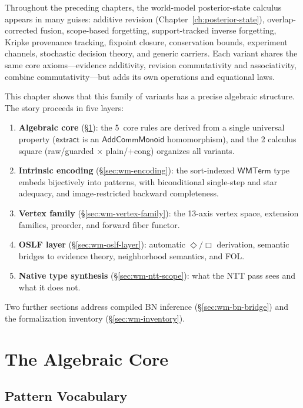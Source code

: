 \documentclass[11pt,openany]{report}
\begin{document}
Throughout the preceding chapters, the world-model posterior-state calculus
appears in many guises: additive revision (Chapter~\ref{ch:posterior-state}),
overlap-corrected fusion, scope-based forgetting, support-tracked inverse
forgetting, Kripke provenance tracking, fixpoint closure, conservation
bounds, experiment channels, stochastic decision theory, and generic
carriers.  Each variant shares the same core axioms---evidence additivity,
revision commutativity and associativity, combine commutativity---but adds
its own operations and equational laws.

This chapter shows that this family of variants has a precise algebraic
structure.  The story proceeds in five layers:
\begin{enumerate}
\item \textbf{Algebraic core} (\S\ref{sec:wm-algebraic-core}): the 5~core
  rules are derived from a single universal property ($\mathsf{extract}$ is
  an $\mathsf{AddCommMonoid}$ homomorphism), and the 2 calculus
  square (raw/guarded $\times$ plain/+cong) organizes all variants.
\item \textbf{Intrinsic encoding} (\S\ref{sec:wm-encoding}): the
  sort-indexed $\mathsf{WMTerm}$ type embeds bijectively into patterns, with
  biconditional single-step and star adequacy, and image-restricted backward
  completeness.
\item \textbf{Vertex family} (\S\ref{sec:wm-vertex-family}): the 13-axis
  vertex space, extension families, preorder, and forward fiber functor.
\item \textbf{OSLF layer} (\S\ref{sec:wm-oslf-layer}): automatic
  $\Diamond/\Box$ derivation, semantic bridges to evidence theory,
  neighborhood semantics, and FOL.
\item \textbf{Native type synthesis} (\S\ref{sec:wm-ntt-scope}): what the
  NTT pass sees and what it does not.
\end{enumerate}
Two further sections address compiled BN inference
(\S\ref{sec:wm-bn-bridge}) and the formalization inventory
(\S\ref{sec:wm-inventory}).

\section{The Algebraic Core}
\label{sec:wm-algebraic-core}

\subsection{Pattern Vocabulary}
\end{document}
